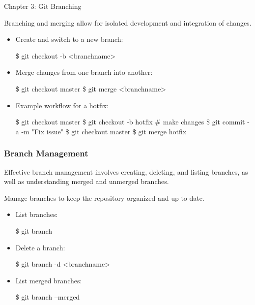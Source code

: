 \begin{notes}{Chapter 3: Git Branching}
    \begin{highlight}
    
        Branching and merging allow for isolated development and integration of changes.
        
        \begin{itemize}
            \item Create and switch to a new branch:
    \begin{code}[Bash]
    \$ git checkout -b <branchname>
    \end{code}
            \item Merge changes from one branch into another:
    \begin{code}[Bash]
    \$ git checkout master
    \$ git merge <branchname>
    \end{code}
            \item Example workflow for a hotfix:
    \begin{code}[Bash]
    \$ git checkout master
    \$ git checkout -b hotfix
    # make changes
    \$ git commit -a -m "Fix issue"
    \$ git checkout master
    \$ git merge hotfix
    \end{code}
        \end{itemize}
    
    \end{highlight}
    
    \subsubsection*{Branch Management}
    
    Effective branch management involves creating, deleting, and listing branches, as well as understanding merged and unmerged branches.
    
    \begin{highlight}
    
        Manage branches to keep the repository organized and up-to-date.
        
        \begin{itemize}
            \item List branches:
    \begin{code}[Bash]
    \$ git branch
    \end{code}
            \item Delete a branch:
    \begin{code}[Bash]
    \$ git branch -d <branchname>
    \end{code}
            \item List merged branches:
    \begin{code}[Bash]
    \$ git branch --merged
    \end{code}
        \end{itemize}
    

\end{highlight}
\end{notes}
